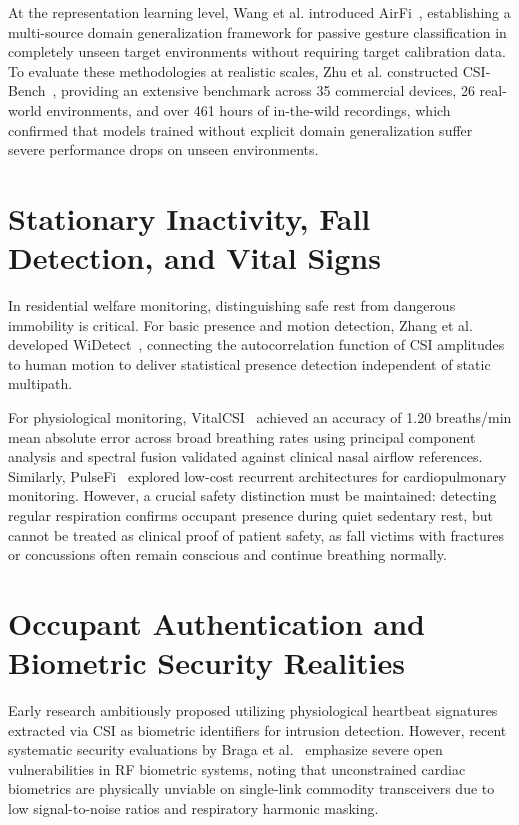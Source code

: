 At the representation learning level, Wang et al. introduced AirFi~\cite{author2024airfi}, establishing a multi-source domain generalization framework for passive gesture classification in completely unseen target environments without requiring target calibration data. To evaluate these methodologies at realistic scales, Zhu et al. constructed CSI-Bench~\cite{csi2025csi}, providing an extensive benchmark across 35 commercial devices, 26 real-world environments, and over 461 hours of in-the-wild recordings, which confirmed that models trained without explicit domain generalization suffer severe performance drops on unseen environments.

\section{Stationary Inactivity, Fall Detection, and Vital Signs}
In residential welfare monitoring, distinguishing safe rest from dangerous immobility is critical. For basic presence and motion detection, Zhang et al. developed WiDetect~\cite{author2019widetect}, connecting the autocorrelation function of CSI amplitudes to human motion to deliver statistical presence detection independent of static multipath.

For physiological monitoring, VitalCSI~\cite{author2026vitalcsi} achieved an accuracy of 1.20 breaths/min mean absolute error across broad breathing rates using principal component analysis and spectral fusion validated against clinical nasal airflow references. Similarly, PulseFi~\cite{author2025pulsefi} explored low-cost recurrent architectures for cardiopulmonary monitoring. However, a crucial safety distinction must be maintained: detecting regular respiration confirms occupant presence during quiet sedentary rest, but cannot be treated as clinical proof of patient safety, as fall victims with fractures or concussions often remain conscious and continue breathing normally.

\section{Occupant Authentication and Biometric Security Realities}
Early research ambitiously proposed utilizing physiological heartbeat signatures extracted via CSI as biometric identifiers for intrusion detection. However, recent systematic security evaluations by Braga et al.~\cite{sok2024sok} emphasize severe open vulnerabilities in RF biometric systems, noting that unconstrained cardiac biometrics are physically unviable on single-link commodity transceivers due to low signal-to-noise ratios and respiratory harmonic masking.

